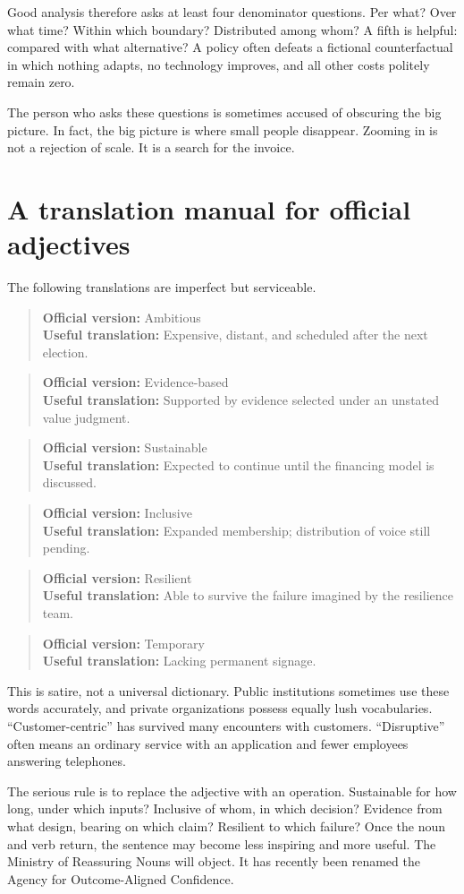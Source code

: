\documentclass[12pt,a4paper]{book}
\newcommand{\officialtranslation}[2]{%
  \begin{quote}\small
  \textbf{Official version:} #1\\
  \textbf{Useful translation:} #2
  \end{quote}}
\begin{document}
Good analysis therefore asks at least four denominator questions.  Per what?
Over what time?  Within which boundary?  Distributed among whom?  A fifth is
helpful: compared with what alternative?  A policy often defeats a fictional
counterfactual in which nothing adapts, no technology improves, and all other
costs politely remain zero.

The person who asks these questions is sometimes accused of obscuring the big
picture.  In fact, the big picture is where small people disappear.  Zooming in
is not a rejection of scale.  It is a search for the invoice.

\section{A translation manual for official adjectives}

The following translations are imperfect but serviceable.

\officialtranslation{Ambitious}{Expensive, distant, and scheduled after the next election.}

\officialtranslation{Evidence-based}{Supported by evidence selected under an unstated value judgment.}

\officialtranslation{Sustainable}{Expected to continue until the financing model is discussed.}

\officialtranslation{Inclusive}{Expanded membership; distribution of voice still pending.}

\officialtranslation{Resilient}{Able to survive the failure imagined by the resilience team.}

\officialtranslation{Temporary}{Lacking permanent signage.}

This is satire, not a universal dictionary.  Public institutions sometimes use
these words accurately, and private organizations possess equally lush
vocabularies.  ``Customer-centric'' has survived many encounters with
customers.  ``Disruptive'' often means an ordinary service with an application
and fewer employees answering telephones.

The serious rule is to replace the adjective with an operation.  Sustainable
for how long, under which inputs?  Inclusive of whom, in which decision?
Evidence from what design, bearing on which claim?  Resilient to which failure?
Once the noun and verb return, the sentence may become less inspiring and more
useful.  The Ministry of Reassuring Nouns will object.  It has recently been
renamed the Agency for Outcome-Aligned Confidence.
\end{document}
